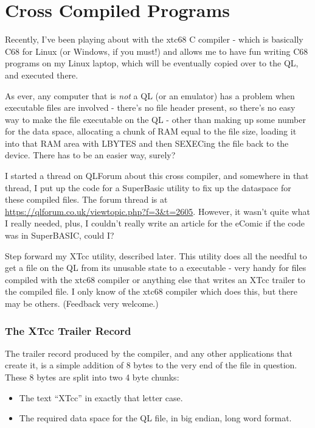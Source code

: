 \chapter{Cross Compiled Programs}\label{chp-cross-compiled-programs}

Recently, I've been playing about with the xtc68 C compiler - which is basically C68 for Linux (or Windows, if you must!) and allows me to have fun writing C68 programs on my Linux laptop, which will be eventually copied over to the QL, and executed there.

As ever, any computer that is \emph{not} a QL (or an emulator) has a problem when executable files are involved - there's no file header present, so there's no easy way to make the file executable on the QL - other than making up some number for the data space, allocating a chunk of RAM equal to the file size, loading it into that RAM area with LBYTES and then SEXECing the file back to the device. There has to be an easier way, surely?

I started a thread on QLForum about this cross compiler, and somewhere in that thread, I put up the code for a SuperBasic utility to fix up the dataspace for these compiled files. The forum thread is at \url{https://qlforum.co.uk/viewtopic.php?f=3&t=2605}. However, it wasn't quite what I really needed, plus, I couldn't really write an article for the eComic if the code was in SuperBASIC, could I?

Step forward my XTcc utility, described later. This utility does all the needful to get a file on the QL from its unusable state to a executable - very handy for files compiled with the xtc68 compiler or anything else that writes an XTcc trailer to the compiled file. I only know of the xtc68 compiler which does this, but there may be others. (Feedback very welcome.)


\subsection{The XTcc Trailer Record}

The trailer record produced by the compiler, and any other applications that create it, is a simple addition of 8 bytes to the very end of the file in question. These 8 bytes are split into two 4 byte chunks:

\begin{itemize}
	\item The text ``XTcc'' in exactly that letter case.
	\item The required data space for the QL file, in big endian, long word format.
\end{itemize}


